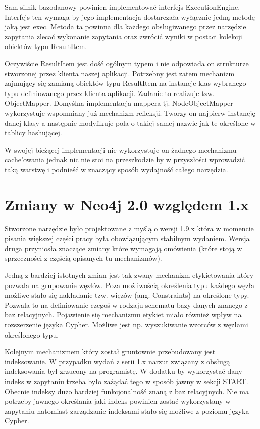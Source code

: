 \documentclass[brudnopis]{xmgr}
\begin{document}
Sam silnik bazodanowy powinien implementować interfejs ExecutionEngine. Interfejs ten wymaga by jego implementacja dostarczała wyłącznie jedną metodę jaką jest exec. Metoda ta powinna dla każdego obsługiwanego przez narzędzie zapytania zlecać wykonanie zapytania oraz zwrócić wyniki w postaci kolekcji obiektów typu ResultItem.

Oczywiście ResultItem jest dość ogólnym typem i nie odpowiada on strukturze stworzonej przez klienta naszej aplikacji. Potrzebny jest zatem mechanizm zajmujący się zamianą obiektów typu ResultItem na instancje klas wybranego typu definiowanego przez klienta aplikacji. Zadanie to realizuje tzw. ObjectMapper. Domyślna implementacja mappera tj. NodeObjectMapper wykorzystuje wspomniany już mechanizm refleksji. Tworzy on najpierw instancję danej klasy a następnie modyfikuje pola o takiej samej nazwie jak te określone w tablicy hashującej.

W swojej bieżącej implementacji nie wykorzystuje on żadnego mechanizmu cache'owania jednak nic nie stoi na przeszkodzie by w przyszłości wprowadzić taką warstwę i podnieść w znaczący sposób wydajność całego narzędzia.

\chapter{Zmiany w Neo4j 2.0 względem 1.x}

Stworzone narzędzie było projektowane z myślą o wersji 1.9.x która w momencie pisania większej części pracy była obowiązującym stabilnym wydaniem. Wersja druga przyniosła znaczące zmiany które wymagają omówienia (które stoją w sprzeczności z częścią opisanych tu mechanizmów).

Jedną z bardziej istotnych zmian jest tak zwany mechanizm etykietowania który pozwala na grupowanie węzłów. Poza możliwością określenia typu każdego węzła możliwe stało się nakładanie tzw. więzów (ang. Constraints) na określone typy. Pozwala to na definiowanie czegoś w rodzaju schematu bazy danych znanego z baz relacyjnych. Pojawienie się mechanizmu etykiet miało również wpływ na rozszerzenie języka Cypher. Możliwe jest np. wyszukiwanie wzorców z węzłami określonego typu.

Kolejnym mechanizmem który został gruntownie przebudowany jest indeksowanie. W przypadku wydań z serii 1.x narzut związany z obsługą indeksowania był zrzucony na programistę. W dodatku by wykorzystać dany indeks w zapytaniu trzeba było zażądać tego w sposób jawny w sekcji START. Obecnie indeksy dużo bardziej funkcjonalność znaną z baz relacyjnych. Nie ma potrzeby jawnego określania jaki indeks powinien zostać wykorzystany w zapytaniu natomiast zarządzanie indeksami stało się możliwe z poziomu języka Cypher.
\end{document}
